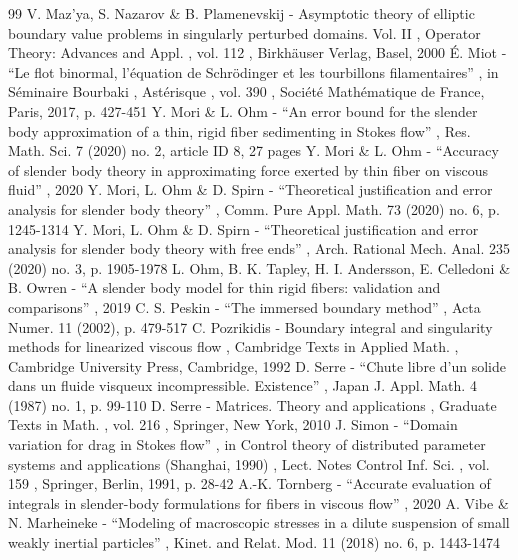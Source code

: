 \documentclass[11pt]{article}
\theoremstyle{definition}
\theoremstyle{remark}
\begin{document}
\begin{thebibliography}{99}
 V. Maz’ya, S. Nazarov \& B. Plamenevskij - Asymptotic theory of elliptic boundary value problems in singularly perturbed domains. Vol. II , Operator Theory: Advances and Appl. , vol. 112 , Birkhäuser Verlag, Basel, 2000
 É. Miot - “Le flot binormal, l’équation de Schrödinger et les tourbillons filamentaires” , in Séminaire Bourbaki , Astérisque , vol. 390 , Société Mathématique de France, Paris, 2017, p. 427-451
 Y. Mori \& L. Ohm - “An error bound for the slender body approximation of a thin, rigid fiber sedimenting in Stokes flow” , Res. Math. Sci. 7 (2020) no. 2, article ID 8, 27 pages
 Y. Mori \& L. Ohm - “Accuracy of slender body theory in approximating force exerted by thin fiber on viscous fluid” , 2020
 Y. Mori, L. Ohm \& D. Spirn - “Theoretical justification and error analysis for slender body theory” , Comm. Pure Appl. Math. 73 (2020) no. 6, p. 1245-1314
 Y. Mori, L. Ohm \& D. Spirn - “Theoretical justification and error analysis for slender body theory with free ends” , Arch. Rational Mech. Anal. 235 (2020) no. 3, p. 1905-1978
 L. Ohm, B. K. Tapley, H. I. Andersson, E. Celledoni \& B. Owren - “A slender body model for thin rigid fibers: validation and comparisons” , 2019
 C. S. Peskin - “The immersed boundary method” , Acta Numer. 11 (2002), p. 479-517
 C. Pozrikidis - Boundary integral and singularity methods for linearized viscous flow , Cambridge Texts in Applied Math. , Cambridge University Press, Cambridge, 1992
 D. Serre - “Chute libre d’un solide dans un fluide visqueux incompressible. Existence” , Japan J. Appl. Math. 4 (1987) no. 1, p. 99-110
 D. Serre - Matrices. Theory and applications , Graduate Texts in Math. , vol. 216 , Springer, New York, 2010
 J. Simon - “Domain variation for drag in Stokes flow” , in Control theory of distributed parameter systems and applications (Shanghai, 1990) , Lect. Notes Control Inf. Sci. , vol. 159 , Springer, Berlin, 1991, p. 28-42
 A.-K. Tornberg - “Accurate evaluation of integrals in slender-body formulations for fibers in viscous flow” , 2020
 A. Vibe \& N. Marheineke - “Modeling of macroscopic stresses in a dilute suspension of small weakly inertial particles” , Kinet. and Relat. Mod. 11 (2018) no. 6, p. 1443-1474
\end{thebibliography}
\end{document}
